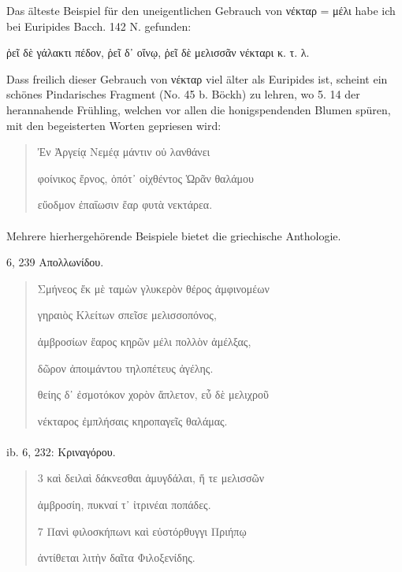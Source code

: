 \documentclass[a4paper, 11pt, oneside]{article}
\begin{document}
Das älteste Beispiel für den uneigentlichen Gebrauch von νέκταρ = μέλι habe ich bei Euripides Bacch. 142 N. gefunden:

ῥεῖ δὲ γάλακτι πέδον, ῥεῖ δ᾽ οἴνῳ, ῥεῖ δὲ μελισσᾶν νέκταρι κ. τ. λ.

Dass freilich dieser Gebrauch von νέκταρ viel älter als Euripides ist, scheint ein schönes Pindarisches Fragment (No. 45 b. Böckh) zu lehren, wo 5. 14 der herannahende Frühling, welchen vor allen die honigspendenden Blumen spüren, mit den begeisterten Worten gepriesen wird:
\begin{quotation}\large
Ἐν Ἀργείᾳ Νεμέᾳ μάντιν οὐ λανθάνει

φοίνικος ἔρνος, ὁπότ᾽ οἰχθέντος Ὡρᾶν θαλάμου

εὔοδμον ἐπαΐωσιν ἔαρ φυτὰ νεκτάρεα.
\end{quotation}
\paragraph{}
Mehrere hierhergehörende Beispiele bietet die griechische Anthologie.

6, 239 Απολλωνίδου.
\begin{quotation}\large
Σμήνεος ἔκ μὲ ταμὼν γλυκερὸν θέρος ἀμφινομέων

\hspace*{5mm}γηραιὸς Κλείτων σπεῖσε μελισσοπόνος,

ἀμβροσίων ἔαρος κηρῶν μέλι πολλὸν ἀμέλξας,

\hspace*{5mm}δῶρον ἀποιμάντου τηλοπέτευς ἀγέλης.

θείης δ᾽ ἐσμοτόκον χορὸν ἄπλετον, εὖ δὲ μελιχροῦ

\hspace*{5mm}νέκταρος ἐμπλήσαις κηροπαγεῖς θαλάμας.
\end{quotation}
\paragraph{}
ib. 6, 232: Κριναγόρου.
\begin{quotation}\large
3 καὶ δειλαὶ δάκνεσθαι ἀμυγδάλαι, ἥ τε μελισσῶν

\hspace*{5mm}ἀμβροσίη, πυκναί τ᾽ ἰτρινέαι ποπάδες.

7 Πανὶ φιλοσκήπωνι καὶ εὐστόρθυγγι Πριήπῳ

\hspace*{5mm}ἀντίθεται λιτὴν δαῖτα Φιλοξενίδης.
\end{quotation}
\end{document}
